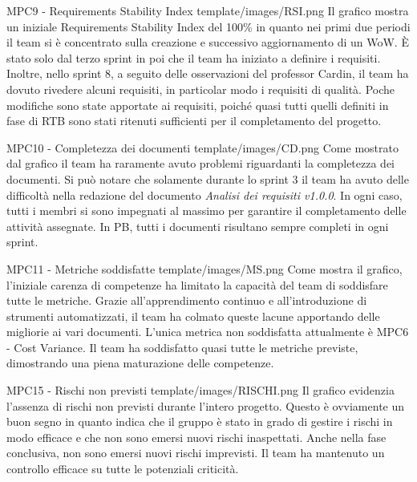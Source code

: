 \Met
{ %
    MPC9 - Requirements Stability Index
}
{ %
    template/images/RSI.png
}
{ %
    Il grafico mostra un iniziale Requirements Stability Index del 100\% in quanto nei primi due periodi il team si è
    concentrato sulla creazione e successivo aggiornamento di un WoW. 
    È stato solo dal terzo sprint in poi che il team ha iniziato a definire i requisiti.
    Inoltre, nello sprint 8, a seguito delle osservazioni del professor Cardin, il team ha dovuto rivedere alcuni requisiti,
    in particolar modo i requisiti di qualità.
}
{ %
    Poche modifiche sono state apportate ai requisiti, poiché quasi tutti quelli definiti in fase di RTB sono stati ritenuti sufficienti per il completamento del progetto.
}

\Met
{ %
    MPC10 - Completezza dei documenti
}
{ %
    template/images/CD.png
}
{ %
    Come mostrato dal grafico il team ha raramente avuto problemi riguardanti la completezza dei documenti.
    Si può notare che solamente durante lo sprint 3 il team ha avuto delle difficoltà nella redazione del documento \textit{Analisi dei requisiti v1.0.0}.
    In ogni caso, tutti i membri si sono impegnati al massimo per garantire il completamento delle attività assegnate.
}
{ %
    In PB, tutti i documenti risultano sempre completi in ogni sprint.
}

\Met
{ %
    MPC11 - Metriche soddisfatte
}
{ %
    template/images/MS.png
}
{ %
    Come mostra il grafico, l'iniziale carenza di competenze ha limitato la capacità del team di soddisfare tutte le metriche.
    Grazie all'apprendimento continuo e all'introduzione di strumenti automatizzati, il team ha colmato queste lacune apportando delle migliorie ai vari documenti.
    L'unica metrica non soddisfatta attualmente è MPC6 - Cost Variance.
}
{ %
    Il team ha soddisfatto quasi tutte le metriche previste, dimostrando una piena maturazione delle competenze.
}

\Met
{ %
    MPC15 - Rischi non previsti
}
{ %
    template/images/RISCHI.png
}
{ %
    Il grafico evidenzia l'assenza di rischi non previsti durante l'intero progetto.
    Questo è ovviamente un buon segno in quanto indica che il gruppo è stato in grado 
    di gestire i rischi in modo efficace e che non sono emersi nuovi rischi inaspettati.
}
{ %
    Anche nella fase conclusiva, non sono emersi nuovi rischi imprevisti. Il team ha mantenuto un controllo efficace su tutte le potenziali criticità.
}

